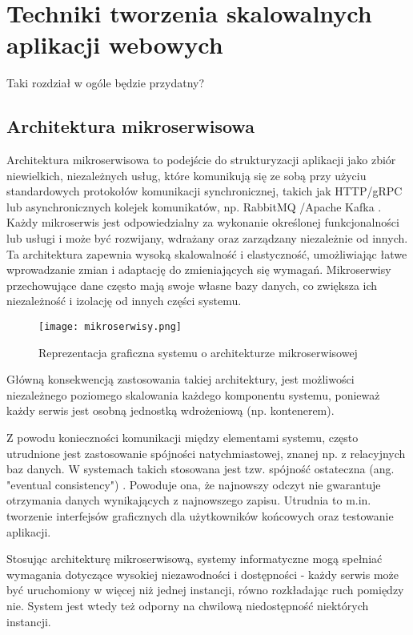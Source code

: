 \clearpage %
\section{Techniki tworzenia skalowalnych aplikacji webowych}

Taki rozdział w ogóle będzie przydatny?

\subsection{Architektura mikroserwisowa}

Architektura mikroserwisowa to podejście do strukturyzacji aplikacji jako zbiór niewielkich, niezależnych usług, które komunikują się ze sobą przy użyciu standardowych protokołów komunikacji synchronicznej, takich jak HTTP/gRPC \cite{grpc} lub asynchronicznych kolejek komunikatów, np. RabbitMQ \cite{rabbitmq}/Apache Kafka \cite{kafka}. Każdy mikroserwis jest odpowiedzialny za wykonanie określonej funkcjonalności lub usługi i może być rozwijany, wdrażany oraz zarządzany niezależnie od innych. Ta architektura zapewnia wysoką skalowalność i elastyczność, umożliwiając łatwe wprowadzanie zmian i adaptację do zmieniających się wymagań. Mikroserwisy przechowujące dane często mają swoje własne bazy danych, co zwiększa ich niezależność i izolację od innych części systemu.

\begin{figure}[!h]
    \centering \texttt{[image: mikroserwisy.png]}
    \caption{Reprezentacja graficzna systemu o architekturze mikroserwisowej \cite{rys1}}
\end{figure}


Główną konsekwencją zastosowania takiej architektury, jest możliwości niezależnego poziomego skalowania każdego komponentu systemu, ponieważ każdy serwis jest osobną jednostką wdrożeniową (np. kontenerem).

Z powodu konieczności komunikacji między elementami systemu, często utrudnione jest zastosowanie spójności natychmiastowej, znanej np. z relacyjnych baz danych. W systemach takich stosowana jest tzw. spójność ostateczna (ang. "eventual consistency") \cite{eventual_consistency}. Powoduje ona, że najnowszy odczyt nie gwarantuje otrzymania danych wynikających z najnowszego zapisu. Utrudnia to m.in. tworzenie interfejsów graficznych dla użytkowników końcowych oraz testowanie aplikacji.

Stosując architekturę mikroserwisową, systemy informatyczne mogą spełniać wymagania dotyczące wysokiej niezawodności i dostępności - każdy serwis może być uruchomiony w więcej niż jednej instancji, równo rozkładając ruch pomiędzy nie. System jest wtedy też odporny na chwilową niedostępność niektórych instancji.

